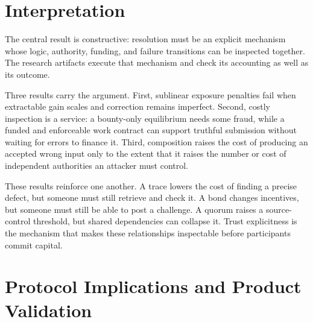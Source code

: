 \documentclass[10pt]{article}
\begin{document}
\section{Interpretation}

The central result is constructive: resolution must be an explicit mechanism whose logic, authority, funding, and failure transitions can be inspected together. The research artifacts execute that mechanism and check its accounting as well as its outcome.

Three results carry the argument. First, sublinear exposure penalties fail when extractable gain scales and correction remains imperfect. Second, costly inspection is a service: a bounty-only equilibrium needs some fraud, while a funded and enforceable work contract can support truthful submission without waiting for errors to finance it. Third, composition raises the cost of producing an accepted wrong input only to the extent that it raises the number or cost of independent authorities an attacker must control.

These results reinforce one another. A trace lowers the cost of finding a precise defect, but someone must still retrieve and check it. A bond changes incentives, but someone must still be able to post a challenge. A quorum raises a source-control threshold, but shared dependencies can collapse it. Trust explicitness is the mechanism that makes these relationships inspectable before participants commit capital.

\section{Protocol Implications and Product Validation}
\label{sec:product}
\end{document}
